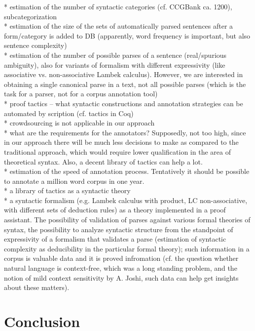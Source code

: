 \documentclass[a4paper]{article}
\theoremstyle{example-style}
\begin{document}
  * estimation of the number of syntactic categories (cf. CCGBank ca. 1200), subcategorization \\
  
  * estimation of the size of the sets of automatically parsed sentences after a form/category is added to DB (apparently, word frequency is important, but also sentence complexity) \\
  
  * estimation of the number of possible parses of a sentence (real/spurious ambiguity), also for variants of formalism with different expressivity (like associative vs. non-associative Lambek calculus). However, we are interested in obtaining a single canonical parse in a text, not all possible parses (which is the task for a parser, not for a corpus annotation tool) \\
  
  * proof tactics -- what syntactic constructions and annotation strategies can be automated by scription (cf. tactics in Coq) \\
  
  * crowdsourcing is not applicable in our approach \\
  
  * what are the requirements for the annotators? Supposedly, not too high, since in our approach there will be much less decisions  to make as compared to the traditional approach, which would require lower qualification in the area of theoretical syntax. Also, a decent library of tactics can help a lot. \\
  
  * estimation of the speed of annotation process. Tentatively it should be possible to annotate a million word corpus in one year.\\
  
  * a library of tactics as a syntactic theory \\
  
  * a syntactic formalism (e.g. Lambek calculus with product, LC non-associative, with different sets of deduction rules) as a theory implemented in a proof assistant. The possibility of validation of parses against various formal theories of syntax, the possibility to analyze syntactic structure from the standpoint of expressivity of a formalism that validates a parse (estimation of syntactic complexity as deducibility in the particular formal theory); such information in a corpus is valuable data and it is proved infromation (cf. the question whether natural language is context-free, which was a long standing problem, and the notion of mild context sensitivity by A. Joshi, such data can help get insights about these matters).

\section{Conclusion}


\nocite{*}
\printbibliography[resetnumbers=true]
\end{document}
